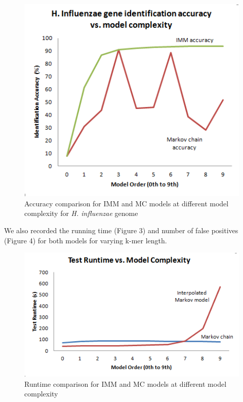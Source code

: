 \documentclass[11pt,letterpaper]{article}
\begin{document}
\begin{figure}
	\begin{center}
		\includegraphics[scale=0.8]{plots/accuracy_vs_model_complexity.png}
	\end{center}
	\caption{\label{font-table} Accuracy comparison for IMM and MC models at different model complexity for \emph{H. influenzae} genome}
\end{figure}

We also recorded the running time (Figure 3) and number of false positives (Figure 4) for both models for varying k-mer length. 

\begin{figure}
	\begin{center}
		\includegraphics[scale=0.8]{plots/runtime_vs_model_complexity.png}
	\end{center}
	\caption{\label{font-table} Runtime comparison for IMM and MC models at different model complexity}
\end{figure}
\end{document}
